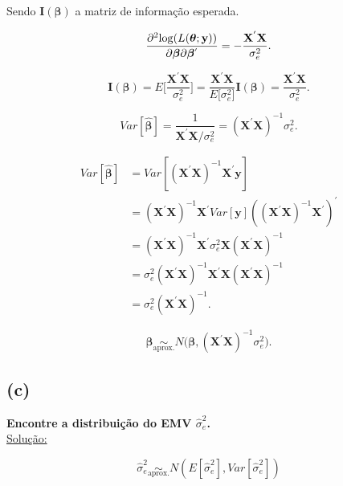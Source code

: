 \documentclass[12pt, oldfontcommands]{article}\usepackage[]{graphicx}\usepackage[]{color}
\begin{document}
\begin{multicols}{2}
Sendo \(\mathbf{I}(\bm{\beta})\) a matriz de informação esperada.

\[ \frac{\partial^2 {\rm log}(L(\bm{\theta};\mathbf{y}))}{\partial
   \bm{\beta} \partial \bm{\beta}^{'}} = -\frac{\mathbf{X}^{'}
   \mathbf{X}}{\sigma_{e}^{2}}. \]
 
\[ \mathbf{I}(\bm{\beta}) =
   E\bigg[\frac{\mathbf{X}^{'}\mathbf{X}}{\sigma_{e}^{2}}\bigg]
   = \frac{\mathbf{X}^{'}\mathbf{X}}{E\Big[
   \sigma_{e}^{2}\Big]} \mathbf{I}(\bm{\beta}) =
   \frac{\mathbf{X}^{'}\mathbf{X}}{\sigma_{e}^{2}}. \]

\[ Var[\hat{\bm{\beta}}] =
   \frac{1}{\mathbf{X}^{'}\mathbf{X}/\sigma_{e}^{2}} =
  (\mathbf{X}^{'}\mathbf{X})^{-1}\sigma_{e}^{2}. \]

\columnbreak

\begin{align*}
 Var[\hat{\bm{\beta}}] & =
 Var[(\mathbf{X}^{'}\mathbf{X})^{-1}\mathbf{X}^{'}\mathbf{y}] \\ & =
 (\mathbf{X}^{'}\mathbf{X})^{-1}\mathbf{X}^{'}Var[\mathbf{y}]
 ((\mathbf{X}^{'}\mathbf{X})^{-1}\mathbf{X}^{'})^{'} \\ & =
 (\mathbf{X}^{'}\mathbf{X})^{-1}\mathbf{X}^{'}\sigma_{e}^{2}
 \mathbf{X}(\mathbf{X}^{'}\mathbf{X})^{-1} \\ & =
 \sigma_{e}^{2}(\mathbf{X}^{'}\mathbf{X})^{-1}\mathbf{X}^{'}
 \mathbf{X}(\mathbf{X}^{'}\mathbf{X})^{-1} \\ & =
 \sigma_{e}^{2}(\mathbf{X}^{'}\mathbf{X})^{-1}.
\end{align*}
\end{multicols}

\[ \boxed{\hat{\bm{\beta}} \underset{\text{aprox.}}{\sim}
          N\Big(\bm{\beta},
                (\mathbf{X}^{'}\mathbf{X})^{-1}\sigma_{e}^{2}\Big).} \]

\subsection*{(c)} 

\textbf{Encontre a distribuição do EMV \(\hat{\sigma}_{e}^{2}\).} \\

\underline{Solução:}

\[ \hat{\sigma}_{e}^{2} \underset{\text{aprox.}}{\sim}
    N(E[\hat{\sigma}_{e}^{2}], Var[\hat{\sigma}_{e}^{2}]) \]
\end{document}
